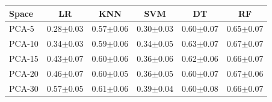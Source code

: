 \begin{tabular}{lccccc}
\toprule
Space & LR & KNN & SVM & DT & RF \\
\midrule
PCA-5 & 0.28$\pm$0.03 & 0.57$\pm$0.06 & 0.30$\pm$0.03 & 0.60$\pm$0.07 & 0.65$\pm$0.07 \\
PCA-10 & 0.34$\pm$0.03 & 0.59$\pm$0.06 & 0.34$\pm$0.05 & 0.63$\pm$0.07 & 0.67$\pm$0.07 \\
PCA-15 & 0.43$\pm$0.07 & 0.60$\pm$0.06 & 0.36$\pm$0.06 & 0.62$\pm$0.06 & 0.66$\pm$0.07 \\
PCA-20 & 0.46$\pm$0.07 & 0.60$\pm$0.05 & 0.36$\pm$0.05 & 0.60$\pm$0.07 & 0.67$\pm$0.06 \\
PCA-30 & 0.57$\pm$0.05 & 0.61$\pm$0.06 & 0.39$\pm$0.04 & 0.60$\pm$0.08 & 0.66$\pm$0.07 \\
\bottomrule
\end{tabular}
